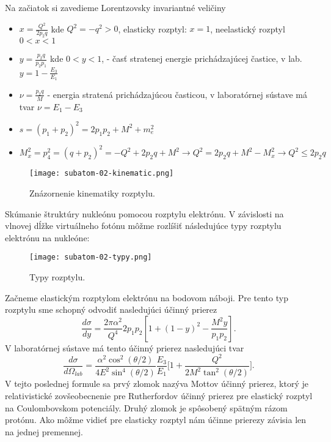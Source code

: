 \documentclass[../../main.tex]{subfiles}
\begin{document}
Na začiatok si zavedieme Lorentzovsky invariantné veličiny
\begin{itemize}
\item $x=\frac{Q^2}{2p_2q}$ kde $Q^2=-q^2>0$, elasticky rozptyl: $x=1$, neelastický rozptyl $0<x<1$
\item $y=\frac{p_2q}{p_2p_1}$ kde $0<y<1$, - časť stratenej energie prichádzajúcej častice, v lab. $y=1-\frac{E_3}{E_1}$
\item $\nu = \frac{p_2q}{M}$ - energia stratená prichádzajúcou časticou, v laboratórnej sústave má tvar $\nu = E_1-E_3$
\item $s=(p_1+p_2)^2 = 2p_1p_2+M^2+m_e^2$
\item $M_x^2 = p_4^2 = (q+p_2)^2 = -Q^2+2p_2q+M^2 \rightarrow Q^2 = 2p_2q+M^2-M_x^2 \rightarrow Q^2 \leq 2p_2q$
\end{itemize}

\begin{figure}[!h]
\texttt{[image: subatom-02-kinematic.png]}
\centering
\caption{Znázornenie kinematiky rozptylu.}
\label{sf2:fig:kinematics}
\end{figure}

Skúmanie štruktúry nukleónu pomocou rozptylu elektrónu. V závislosti na vlnovej dĺžke virtuálneho fotónu môžme rozlíšiť následujúce typy rozptylu elektrónu na nukleóne: 

\begin{figure}[!h]
\texttt{[image: subatom-02-typy.png]}
\centering
\caption{Typy rozptylu.}
\label{sf2:fig:typy}
\end{figure}

Začneme elastickým rozptylom elektrónu na bodovom náboji. Pre tento typ rozptylu sme schopný odvodiť nasledujúci účinný prierez
\begin{equation}
 \frac{d\sigma}{dy} = \frac{2\pi \alpha^2}{Q^4}2p_1p_2 \left[ 1+(1-y)^2-\frac{M^2y}{p_1p_2} \right].
\end{equation}
V laboratórnej sústave má tento účinný prierez nasledujúci tvar
\begin{equation}
\frac{d\sigma}{d\Omega_{lab}} = \frac{\alpha^2 \cos^2(\theta/2)}{4E^2\sin^4(\theta/2)} \frac{E_3}{E_1} \bigg[ 1+\frac{Q^2}{2M^2\tan^2(\theta/2)} \bigg].
\end{equation}
V tejto poslednej formule sa prvý zlomok nazýva Mottov účinný prierez, ktorý je relativistické zovšeobecnenie pre Rutherfordov účinný prierez pre elastický rozptyl na Coulombovskom potenciály. Druhý zlomok je spôsobený spätným rázom protónu. Ako môžme vidieť pre elasticky rozptyl nám účinne prierezy závisia len na jednej premennej.
\end{document}
